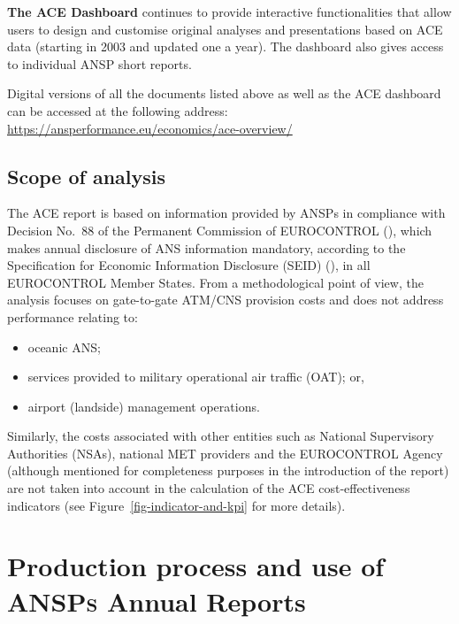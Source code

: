 \documentclass[
  11pt,
  a4paperpaper,
  openany,headsepline=on,footsepline=off,DIV=12,table]{scrbook}
\begin{document}
\textbf{The ACE Dashboard} continues to provide interactive
functionalities that allow users to design and customise original
analyses and presentations based on ACE data (starting in 2003 and
updated one a year). The dashboard also gives access to individual ANSP
short reports.

Digital versions of all the documents listed above as well as the ACE
dashboard can be accessed at the following address:
\url{https://ansperformance.eu/economics/ace-overview/}

\section{Scope of analysis}\label{scope-of-analysis}

The ACE report is based on information provided by ANSPs in compliance
with Decision No.~88 of the Permanent Commission of EUROCONTROL
(), which makes annual disclosure of ANS information
mandatory, according to the Specification for Economic Information
Disclosure (SEID) (), in all
EUROCONTROL Member States. From a methodological point of view, the
analysis focuses on gate-to-gate ATM/CNS provision costs and does not
address performance relating to:

\begin{itemize}
\item
  oceanic ANS;
\item
  services provided to military operational air traffic (OAT); or,
\item
  airport (landside) management operations.
\end{itemize}

Similarly, the costs associated with other entities such as National
Supervisory Authorities (NSAs), national MET providers and the
EUROCONTROL Agency (although mentioned for completeness purposes in the
introduction of the report) are not taken into account in the
calculation of the ACE cost‐effectiveness indicators (see
Figure~\ref{fig-indicator-and-kpi} for more details).


\chapter{\texorpdfstring{Production process and use of ANSP\textsc{s}
Annual
Reports}{Production process and use of ANSPs Annual Reports}}\label{production-process-and-use-of-ansps-annual-reports}
\end{document}
